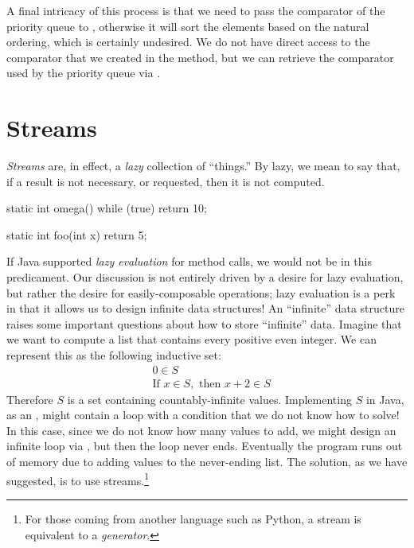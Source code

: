 A final intricacy of this process is that we need to pass the comparator of the priority queue to , otherwise it will sort the elements based on the natural ordering, which is certainly undesired. We do not have direct access to the comparator that we created in the  method, but we can retrieve the comparator used by the priority queue via . 

\section{Streams}
\emph{Streams} are, in effect, a \emph{lazy} collection of ``things.'' By lazy, we mean to say that, if a result is not necessary, or requested, then it is not computed.


\begin{verbnobox}[\small]
static int omega() {
  while (true) {}
  return 10;
}
\end{verbnobox}
\begin{verbnobox}[\small]
static int foo(int x) {
  return 5;
}
\end{verbnobox}

If Java supported \emph{lazy evaluation} for method calls, we would not be in this predicament. Our discussion is not entirely driven by a desire for lazy evaluation, but rather the desire for easily-composable operations; lazy evaluation is a perk in that it allows us to design infinite data structures! An ``infinite'' data structure raises some important questions about how to store ``infinite'' data. Imagine that we want to compute a list that contains every positive even integer. We can represent this as the following inductive set:
\begin{align*}
    &0 \in S\\
    &\text{If } x \in S,\text{ then }x + 2 \in S
\end{align*}
Therefore $S$ is a set containing countably-infinite values. Implementing $S$ in Java, as an , might contain a  loop with a condition that we do not know how to solve! In this case, since we do not know how many values to add, we might design an infinite loop via , but then the loop never ends. Eventually the program runs out of memory due to adding values to the never-ending list. The solution, as we have suggested, is to use streams.\footnote{For those coming from another language such as Python, a stream is equivalent to a \emph{generator}.}

